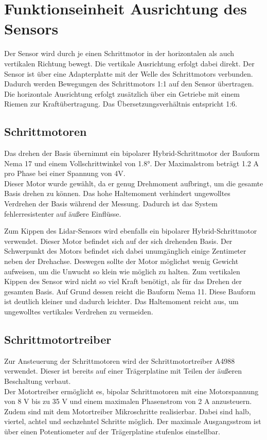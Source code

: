  

\section{Funktionseinheit Ausrichtung des Sensors}

Der Sensor wird durch je einen Schrittmotor in der horizontalen als auch vertikalen Richtung bewegt. Die vertikale Ausrichtung erfolgt dabei direkt. Der Sensor ist über eine Adapterplatte mit der Welle des Schrittmotors verbunden. Dadurch werden Bewegungen des Schrittmotors 1:1 auf den Sensor übertragen.\\
Die horizontale Ausrichtung erfolgt zusätzlich über ein Getriebe mit einem Riemen zur Kraftübertragung. Das Übersetzungsverhältnis entspricht 1:6. 

\subsection{Schrittmotoren}
Das drehen der Basis übernimmt ein bipolarer Hybrid-Schrittmotor der Bauform Nema 17 und einem Vollschrittwinkel von 1.8°. Der Maximalstrom beträgt 1.2 A pro Phase bei einer Spannung von 4V.\\
Dieser Motor wurde gewählt, da er genug Drehmoment aufbringt, um die gesamte Basis drehen zu können. Das hohe Haltemoment verhindert ungewolltes Verdrehen der Basis während der Messung. Dadurch ist das System fehlerresistenter auf äußere Einflüsse. 


Zum Kippen des Lidar-Sensors wird ebenfalls ein bipolarer Hybrid-Schrittmotor verwendet. Dieser Motor befindet sich auf der sich drehenden Basis. Der Schwerpunkt des Motors befindet sich dabei unumgänglich einige Zentimeter neben der Drehachse. Deswegen sollte der Motor möglichst wenig Gewicht aufweisen, um die Unwucht so klein wie möglich zu halten.
Zum vertikalen Kippen des Sensor wird nicht so viel Kraft benötigt, als für das Drehen der gesamten Basis. Auf Grund dessen reicht die Bauform Nema 11. Diese Bauform ist deutlich kleiner und dadurch leichter.
Das Haltemoment reicht aus, um ungewolltes vertikales Verdrehen zu vermeiden.


\subsection{Schrittmotortreiber}
Zur Ansteuerung der Schrittmotoren wird der Schrittmotortreiber A4988 verwendet. Dieser ist bereits auf einer Trägerplatine mit Teilen der äußeren Beschaltung verbaut.\\
Der Motortreiber ermöglicht es, bipolar Schrittmotoren mit eine Motorspannung von 8 V bis zu 35 V und einem maximalen Phasenstrom von 2 A anzusteuern.
Zudem sind mit dem Motortreiber Mikroschritte realisierbar. Dabei sind halb, viertel, achtel und sechzehntel Schritte möglich. Der maximale Ausgangsstrom ist über einen Potentiometer auf der Trägerplatine stufenlos einstellbar. 

